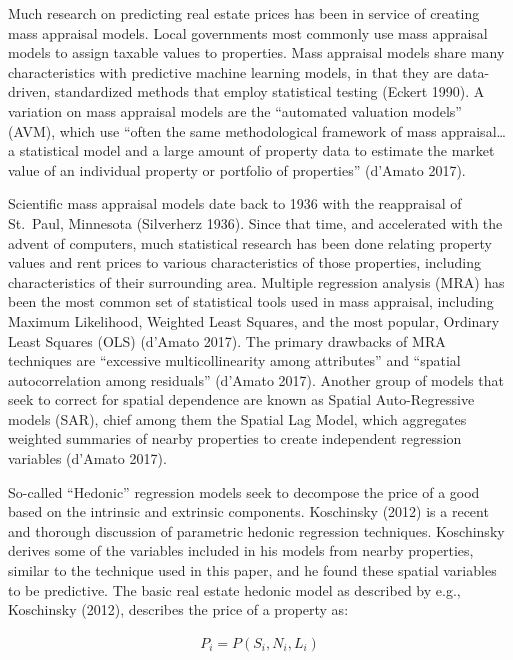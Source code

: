 \documentclass[12pt,]{article}
\begin{document}
Much research on predicting real estate prices has been in service of
creating mass appraisal models. Local governments most commonly use mass
appraisal models to assign taxable values to properties. Mass appraisal
models share many characteristics with predictive machine learning
models, in that they are data-driven, standardized methods that employ
statistical testing (Eckert 1990). A variation on mass appraisal models
are the ``automated valuation models'' (AVM), which use ``often the same
methodological framework of mass appraisal\ldots{} a statistical model
and a large amount of property data to estimate the market value of an
individual property or portfolio of properties'' (d'Amato 2017).

Scientific mass appraisal models date back to 1936 with the reappraisal
of St.~Paul, Minnesota (Silverherz 1936). Since that time, and
accelerated with the advent of computers, much statistical research has
been done relating property values and rent prices to various
characteristics of those properties, including characteristics of their
surrounding area. Multiple regression analysis (MRA) has been the most
common set of statistical tools used in mass appraisal, including
Maximum Likelihood, Weighted Least Squares, and the most popular,
Ordinary Least Squares (OLS) (d'Amato 2017). The primary drawbacks of
MRA techniques are ``excessive multicollinearity among attributes'' and
``spatial autocorrelation among residuals'' (d'Amato 2017). Another
group of models that seek to correct for spatial dependence are known as
Spatial Auto-Regressive models (SAR), chief among them the Spatial Lag
Model, which aggregates weighted summaries of nearby properties to
create independent regression variables (d'Amato 2017).

So-called ``Hedonic'' regression models seek to decompose the price of a
good based on the intrinsic and extrinsic components. Koschinsky (2012)
is a recent and thorough discussion of parametric hedonic regression
techniques. Koschinsky derives some of the variables included in his
models from nearby properties, similar to the technique used in this
paper, and he found these spatial variables to be predictive. The basic
real estate hedonic model as described by e.g., Koschinsky (2012),
describes the price of a property as:

\[
\begin{aligned}
 P_i = P(S_i, N_i, L_i)
\end{aligned}
\]
\end{document}
